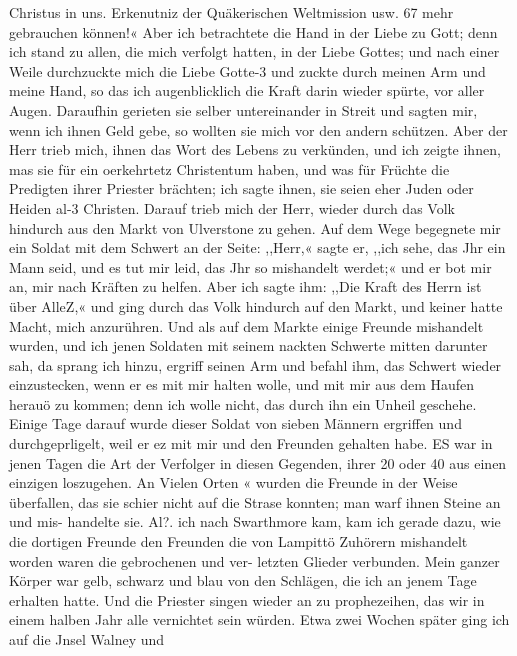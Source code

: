 Christus in uns. Erkenutniz der Quäkerischen Weltmission usw. 67
mehr gebrauchen können!« Aber ich betrachtete die Hand in der
Liebe zu Gott; denn ich stand zu allen, die mich verfolgt hatten,
in der Liebe Gottes; und nach einer Weile durchzuckte mich die
Liebe Gotte-3 und zuckte durch meinen Arm und meine Hand,
so das ich augenblicklich die Kraft darin wieder spürte, vor aller
Augen. Daraufhin gerieten sie selber untereinander in Streit und
sagten mir, wenn ich ihnen Geld gebe, so wollten sie mich vor
den andern schützen. Aber der Herr trieb mich, ihnen das Wort
des Lebens zu verkünden, und ich zeigte ihnen, mas sie für ein
oerkehrtetz Christentum haben, und was für Früchte die Predigten
ihrer Priester brächten; ich sagte ihnen, sie seien eher Juden oder
Heiden al-3 Christen. Darauf trieb mich der Herr, wieder durch
das Volk hindurch aus den Markt von Ulverstone zu gehen. Auf
dem Wege begegnete mir ein Soldat mit dem Schwert an der
Seite: ,,Herr,« sagte er, ,,ich sehe, das Jhr ein Mann seid, und
es tut mir leid, das Jhr so mishandelt werdet;« und er bot mir
an, mir nach Kräften zu helfen. Aber ich sagte ihm: ,,Die Kraft
des Herrn ist über AlleZ,« und ging durch das Volk hindurch auf
den Markt, und keiner hatte Macht, mich anzurühren. Und als
auf dem Markte einige Freunde mishandelt wurden, und ich jenen
Soldaten mit seinem nackten Schwerte mitten darunter sah, da
sprang ich hinzu, ergriff seinen Arm und befahl ihm, das Schwert
wieder einzustecken, wenn er es mit mir halten wolle, und mit
mir aus dem Haufen herauö zu kommen; denn ich wolle nicht,
das durch ihn ein Unheil geschehe. Einige Tage darauf wurde
dieser Soldat von sieben Männern ergriffen und durchgeprligelt,
weil er ez mit mir und den Freunden gehalten habe. ES war
in jenen Tagen die Art der Verfolger in diesen Gegenden,
ihrer 20 oder 40 aus einen einzigen loszugehen. An Vielen Orten «
wurden die Freunde in der Weise überfallen, das sie schier nicht
auf die Strase konnten; man warf ihnen Steine an und mis-
handelte sie. Al?. ich nach Swarthmore kam, kam ich gerade
dazu, wie die dortigen Freunde den Freunden die von Lampittö
Zuhörern mishandelt worden waren die gebrochenen und ver-
letzten Glieder verbunden. Mein ganzer Körper war gelb, schwarz
und blau von den Schlägen, die ich an jenem Tage erhalten
hatte. Und die Priester singen wieder an zu prophezeihen, das
wir in einem halben Jahr alle vernichtet sein würden.
Etwa zwei Wochen später ging ich auf die Jnsel Walney und
 


